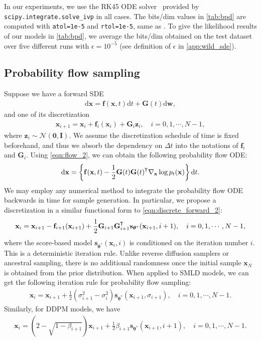 \documentclass{article} \usepackage{iclr2021_conference,times}
\newcommand*{\tran}{^{\mkern-1.5mu\mathsf{T}}}
\newcommand{\ud}{\mathrm{d}}
\newcommand{\mcal}{\mathcal}
\newcommand{\bfx}{\mathbf{x}}
\newcommand{\bfw}{\mathbf{w}}
\newcommand{\bfz}{\mathbf{z}}
\newcommand{\bfI}{\mathbf{I}}
\newcommand{\bff}{\mathbf{f}}
\newcommand{\bfzero}{\mathbf{0}}
\newcommand{\bftheta}{{\boldsymbol{\theta}}}
\newcommand{\bfs}{\mathbf{s}}
\newcommand{\bfG}{\mathbf{G}}
\begin{document}
In our experiments, we use the RK45 ODE solver~\citep{dormand1980family} provided by \verb|scipy.integrate.solve_ivp| in all cases. The bits/dim values in \cref{tab:bpd} are computed with \verb|atol=1e-5| and \verb|rtol=1e-5|, same as \citet{grathwohl2018ffjord}. To give the likelihood results of our models in \cref{tab:bpd}, we average the bits/dim obtained on the test dataset over five different runs with $\epsilon=10^{-5}$ (see definition of $\epsilon$ in \cref{app:wild_sde}).

\subsection{Probability flow sampling}\label{app:prob_flow_sampling}
Suppose we have a forward SDE
\begin{align*}
    \ud \bfx = \bff(\bfx, t) \ud t + \bfG(t) \ud \bfw,
\end{align*}
and one of its discretization
\begin{align}
    \bfx_{i+1} = \bfx_i + \bff_i(\bfx_i) + \bfG_i \bfz_i, \quad i = 0, 1, \cdots, N-1, \label{eqn:discrete_forward_2}
\end{align}
where $\bfz_i \sim \mcal{N}(\bfzero, \bfI)$. We assume the discretization schedule of time is fixed beforehand, and thus we absorb the dependency on $\Delta t$ into the notations of $\bff_i$ and $\bfG_i$. Using \cref{eqn:flow_2}, we can obtain the following probability flow ODE:
\begin{align}
    \ud \bfx = \left\{ \bff(\bfx, t) - \frac{1}{2}\bfG(t)\bfG(t)\tran \nabla_\bfx \log p_t(\bfx) \right\} \ud t.
\end{align}
We may employ any numerical method to integrate the probability flow ODE backwards in time for sample generation. In particular, we propose a discretization in a similar functional form to \cref{eqn:discrete_forward_2}:
\begin{align*}
    \bfx_i = \bfx_{i+1} - \bff_{i+1}(\bfx_{i+1}) + \frac{1}{2}\bfG_{i+1}\bfG_{i+1}\tran \bfs_{\bftheta^*}(\bfx_{i+1}, i+1),\quad  i =0,1,\cdots, N-1,
\end{align*}
where the score-based model $\bfs_{\bftheta^*}(\bfx_i, i)$ is conditioned on the iteration number $i$. This is a deterministic iteration rule. Unlike reverse diffusion samplers or ancestral sampling, there is no additional randomness once the initial sample $\bfx_N$ is obtained from the prior distribution. When applied to SMLD models, we can get the following iteration rule for probability flow sampling:
\begin{align}
    \bfx_i = \bfx_{i+1} + \frac{1}{2} (\sigma_{i+1}^2 - \sigma_i^2) \bfs_{{\bftheta^*}}(\bfx_{i+1}, \sigma_{i+1}), \quad i=0,1,\cdots, N-1.
\end{align}
Similarly, for DDPM models, we have
\begin{align}
    \bfx_i = (2 - \sqrt{1 -\beta_{i+1}})\bfx_{i+1} + \frac{1}{2} \beta_{i+1} \bfs_{\bftheta^*}(\bfx_{i+1}, i+1), \quad i=0,1,\cdots, N-1.
\end{align}
\end{document}
